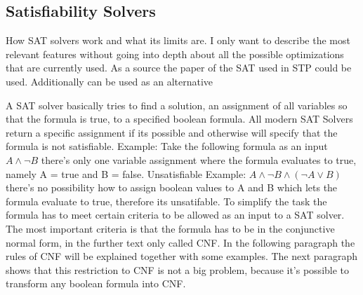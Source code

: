 \subsection{Satisfiability Solvers}
How SAT solvers work and what its limits are.
I only want to describe the most relevant features without going into depth about all the possible optimizations that are currently used.
As a source the paper of the SAT used in STP \cite{10.1007/978-3-540-24605-3_37} could be used. Additionally \cite{Gomes2008SatisfiabilityS} can be used as an alternative

A SAT solver basically tries to find a solution, an assignment of all variables so that the formula is true, to a specified boolean formula. All modern SAT Solvers return a specific assignment if its possible and otherwise will specify that the formula is not satisfiable.
Example: Take the following formula as an input $A \land \lnot B$ there's only one variable assignment where the formula evaluates to true, namely A = true and B = false.
Unsatisfiable Example: $A \land \lnot B \land (\lnot A \lor B)$ there's no possibility how to assign boolean values to A and B which lets the formula evaluate to true, therefore its unsatifable.
To simplify the task the formula has to meet certain criteria to be allowed as an input to a SAT solver. The most important criteria is that the formula has to be in the conjunctive normal form, in the further text only called CNF. In the following paragraph the rules of CNF will be explained together with some examples. The next paragraph shows that this restriction to CNF is not a big problem, because it's possible to transform any boolean formula into CNF\cite{Jackson:2004:CFC:2103144.2103160}.\\
